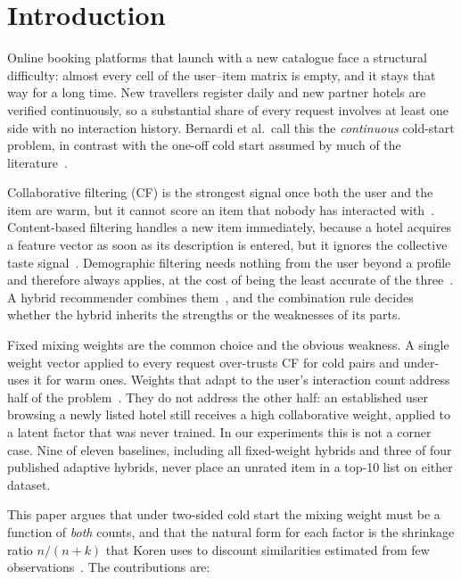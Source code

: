 \documentclass[runningheads]{llncs}
\begin{document}
\section{Introduction}

Online booking platforms that launch with a new catalogue face a structural difficulty: almost every cell of the user--item matrix is empty, and it stays that way for a long time. New travellers register daily and new partner hotels are verified continuously, so a substantial share of every request involves at least one side with no interaction history. Bernardi et al.\ call this the \emph{continuous} cold-start problem, in contrast with the one-off cold start assumed by much of the literature~\cite{bernardi2015}.

Collaborative filtering (CF) is the strongest signal once both the user and the item are warm, but it cannot score an item that nobody has interacted with~\cite{schein2002}. Content-based filtering handles a new item immediately, because a hotel acquires a feature vector as soon as its description is entered, but it ignores the collective taste signal~\cite{lops2011}. Demographic filtering needs nothing from the user beyond a profile and therefore always applies, at the cost of being the least accurate of the three~\cite{pazzani1999}. A hybrid recommender combines them~\cite{burke2002}, and the combination rule decides whether the hybrid inherits the strengths or the weaknesses of its parts.

Fixed mixing weights are the common choice and the obvious weakness. A single weight vector applied to every request over-trusts CF for cold pairs and under-uses it for warm ones. Weights that adapt to the user's interaction count address half of the problem~\cite{melville2002,do2020}. They do not address the other half: an established user browsing a newly listed hotel still receives a high collaborative weight, applied to a latent factor that was never trained. In our experiments this is not a corner case. Nine of eleven baselines, including all fixed-weight hybrids and three of four published adaptive hybrids, never place an unrated item in a top-10 list on either dataset.

This paper argues that under two-sided cold start the mixing weight must be a function of \emph{both} counts, and that the natural form for each factor is the shrinkage ratio $n/(n+k)$ that Koren uses to discount similarities estimated from few observations~\cite{koren2008}. The contributions are:
\end{document}
